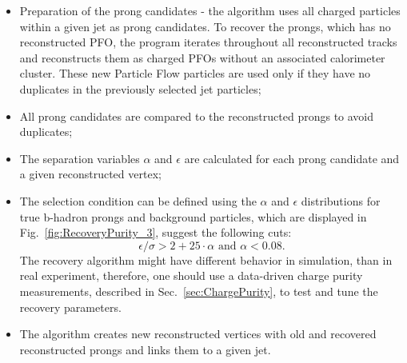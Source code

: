 \begin{itemize}
\item Preparation of the prong candidates - the algorithm uses all charged particles within a given jet as prong candidates. To recover the prongs, which has no reconstructed PFO, the program iterates throughout all reconstructed tracks and reconstructs them as charged PFOs without an associated calorimeter cluster. These new Particle Flow particles are used only if they have no duplicates in the previously selected jet particles;
\item All prong candidates are compared to the reconstructed prongs to avoid duplicates;
\item The separation variables $\alpha$ and $\epsilon$ are calculated for each prong candidate and a given reconstructed vertex;
\item The selection condition can be defined using the $\alpha$ and $\epsilon$ distributions for true b-hadron prongs and background particles, which are displayed in Fig.~\ref{fig:RecoveryPurity_3}, suggest the following cuts:
\begin{equation}
\epsilon/\sigma > 2 + 25\cdot\alpha\text{ and } \alpha < 0.08.
\end{equation}
The recovery algorithm might have different behavior in simulation, than in real experiment, therefore, one should use a data-driven charge purity measurements, described in Sec.~\ref{sec:ChargePurity}, to test and tune the recovery parameters.
\item The algorithm creates new reconstructed vertices with old and recovered reconstructed prongs and links them to a given jet.
\end{itemize}


